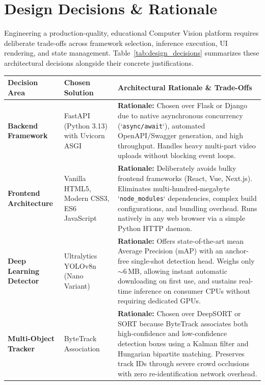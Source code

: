 \section{Design Decisions \& Rationale}

Engineering a production-quality, educational Computer Vision platform requires deliberate trade-offs across framework selection, inference execution, UI rendering, and state management. Table~\ref{tab:design_decisions} summarizes these architectural decisions alongside their concrete justifications.

\begin{table}[htbp]
    \centering
    \small
    \renewcommand{\arraystretch}{1.3}
    \begin{tabularx}{\textwidth}{|p{3.2cm}|p{3.0cm}|X|}
        \hline
        \textbf{Decision Area} & \textbf{Chosen Solution} & \textbf{Architectural Rationale \& Trade-Offs} \\
        \hline
        \textbf{Backend Framework} & FastAPI (Python 3.13) with Uvicorn ASGI & \textbf{Rationale:} Chosen over Flask or Django due to native asynchronous concurrency (`\texttt{async/await}`), automated OpenAPI/Swagger generation, and high throughput. Handles heavy multi-part video uploads without blocking event loops. \\
        \hline
        \textbf{Frontend Architecture} & Vanilla HTML5, Modern CSS3, ES6 JavaScript & \textbf{Rationale:} Deliberately avoids bulky frontend frameworks (React, Vue, Next.js). Eliminates multi-hundred-megabyte `\texttt{node\_modules}` dependencies, complex build configurations, and bundling overhead. Runs natively in any web browser via a simple Python HTTP daemon. \\
        \hline
        \textbf{Deep Learning Detector} & Ultralytics YOLOv8n (Nano Variant) & \textbf{Rationale:} Offers state-of-the-art mean Average Precision (mAP) with an anchor-free single-shot detection head. Weighs only $\sim6$\,MB, allowing instant automatic downloading on first use, and sustains real-time inference on consumer CPUs without requiring dedicated GPUs. \\
        \hline
        \textbf{Multi-Object Tracker} & ByteTrack Association & \textbf{Rationale:} Chosen over DeepSORT or SORT because ByteTrack associates both high-confidence and low-confidence detection boxes using a Kalman filter and Hungarian bipartite matching. Preserves track IDs through severe crowd occlusions with zero re-identification network overhead. \\

\end{tabularx}
\end{table}
